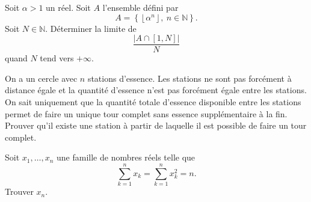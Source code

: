 \documentclass[11pt,a4paper]{article}
\begin{document}
\begin{exercise}
Soit $\alpha>1$ un réel.
Soit $A$ l'ensemble défini par
\[
A=\left\{\left\lfloor \alpha^n\right\rfloor,\ n\in\mathbb{N}\right\}.
\]
Soit $N\in\mathbb{N}$.
Déterminer la limite de
\[
\frac{\left|A\cap[1,N]\right|}{N}
\]
quand $N$ tend vers $+\infty$.
\end{exercise}

\begin{exercise}
On a un cercle avec $n$ stations d'essence. 
Les stations ne sont pas forcément à distance égale et la quantité d'essence n'est pas forcément 
égale entre les stations. On sait uniquement que la quantité totale d'essence disponible entre 
les stations permet de faire un unique tour complet sans essence supplémentaire à la fin. 
Prouver qu'il existe une station à partir de laquelle il est possible de faire un tour complet.
\end{exercise}

\begin{exercise}
Soit $x_1,\ldots,x_n$ une famille de nombres réels telle que
\[
\sum_{k=1}^{n}x_k=\sum_{k=1}^{n}x_k^2=n.
\]
Trouver $x_n$.
\end{exercise}
\end{document}
